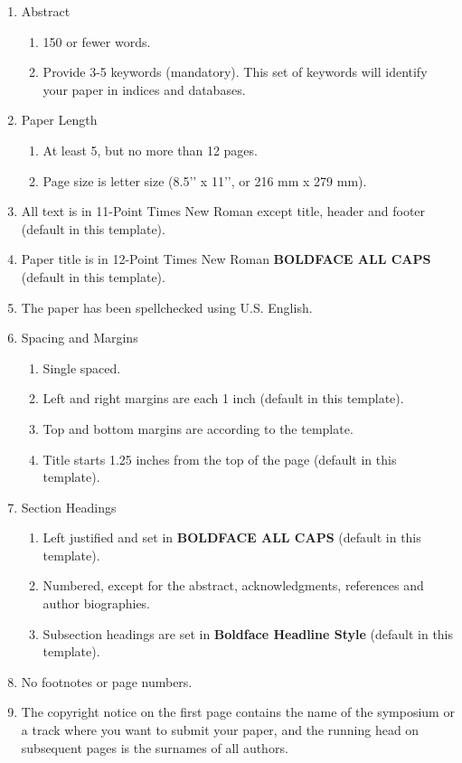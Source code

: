 \documentclass{scspaperproc}
\theoremstyle{scsthe}
\begin{document}
\begin{enumerate}
	\item Abstract
  \begin{enumerate}
	  \item 150 or fewer words.
	  \item Provide 3-5 keywords (mandatory). This set of keywords will identify your paper in indices and databases.
	\end{enumerate}
	\item Paper Length
  \begin{enumerate}
	  \item At least 5, but no more than 12 pages.
	  \item Page size is letter size (8.5’’ x 11’’, or 216 mm x 279 mm).
	\end{enumerate}
	\item All text is in 11-Point Times New Roman except title, header and footer (default in this template).
	\item Paper title is in 12-Point Times New Roman \textbf{BOLDFACE ALL CAPS} (default in this template).
	\item The paper has been spellchecked using U.S. English. 
	\item Spacing and Margins
  \begin{enumerate}
	  \item Single spaced.
	  \item Left and right margins are each 1 inch (default in this template).
	  \item Top and bottom margins are according to the template.
	  \item Title starts 1.25 inches from the top of the page (default in this template).
	\end{enumerate}
	\item Section Headings
  \begin{enumerate}
	  \item Left justified and set in \textbf{BOLDFACE ALL CAPS} (default in this template).
	  \item Numbered, except for the abstract, acknowledgments, references and author biographies.
	  \item Subsection headings are set in \textbf{Boldface Headline Style} (default in this template).
	\end{enumerate}
	\item No footnotes or page numbers.
	\item The copyright notice on the first page contains the name of the symposium or a track where you want to submit your paper, and the running head on subsequent pages is the surnames of all authors.

\end{enumerate}
\end{document}

